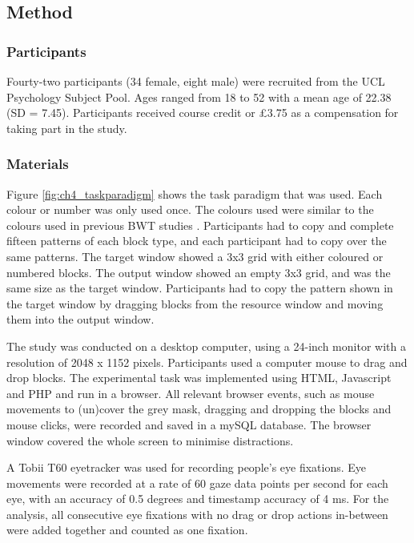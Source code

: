 \subsection{Method}
\subsubsection{Participants}
Fourty-two participants (34 female, eight male) were recruited from the UCL Psychology Subject Pool. Ages ranged from 18 to 52 with a mean age of 22.38 (SD = 7.45). Participants received course credit or \pounds3.75 as a compensation for taking part in the study.

\subsubsection{Materials}
Figure \ref{fig:ch4_taskparadigm} shows the task paradigm that was used. Each colour or number was only used once. The colours used were similar to the colours used in previous BWT studies \citep[e.g.][]{Gray2006, Morgan2009}.
Participants had to copy and complete fifteen patterns of each block type, and each participant had to copy over the same patterns. The target window showed a 3x3 grid with either coloured or numbered blocks. The output window showed an empty 3x3 grid, and was the same size as the target window. Participants had to copy the pattern shown in the target window by dragging blocks from the resource window and moving them into the output window. 

The study was conducted on a desktop computer, using a 24-inch monitor with a resolution of 2048 x 1152 pixels. Participants used a computer mouse to drag and drop blocks. The experimental task was implemented using HTML, Javascript and PHP and run in a browser.  All relevant browser events, such as mouse movements to (un)cover the grey mask, dragging and dropping the blocks and mouse clicks, were recorded and saved in a mySQL database. The browser window covered the whole screen to minimise distractions.

A Tobii T60 eyetracker was used for recording people's eye fixations. Eye movements were recorded at a rate of 60 gaze data points per second for each eye, with an accuracy of 0.5 degrees and timestamp accuracy of 4 ms. For the analysis, all consecutive eye fixations with no drag or drop actions in-between were added together and counted as one fixation.

